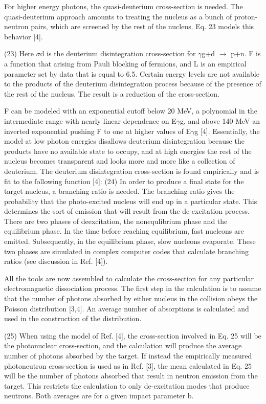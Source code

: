     For higher energy photons, the quasi-deuterium cross-section is needed.
    The quasi-deuterium approach amounts to treating the nucleus as a bunch of proton-neutron pairs, which are screened by the rest of the nucleus.
    Eq.
    23 models this behavior [4].
    
    (23)
    Here $\sigma$d is the deuterium disintegration cross-section for $\gamma$g+d $\rightarrow$ p+n.
    F is a function that arising from Pauli blocking of fermions, and L is an empirical parameter set by data that is equal to 6.5.
    Certain energy levels are not available to the products of the deuterium disintegration process because of the presence of the rest of the nucleus.
    The result is a reduction of the cross-section.
    
    F can be modeled with an exponential cutoff below 20 MeV, a polynomial in the intermediate range with nearly linear dependence on E$\gamma$g, and above 140 MeV an inverted exponential pushing F to one at higher values of E$\gamma$g [4].
    Essentially, the model at low photon energies disallows deuterium disintegration because the products have no available state to occupy, and at high energies the rest of the nucleus becomes transparent and looks more and more like a collection of deuterium.
    The deuterium disintegration cross-section is found empirically and is fit to the following function [4]:
    (24)
    In order to produce a final state for the target nucleus, a branching ratio is needed.
    The branching ratio gives the probability that the photo-excited nucleus will end up in a particular state.
    This determines the sort of emission that will result from the de-excitation process.
    There are two phases of deexcitation, the nonequlibrium phase and the equilibrium phase.
    In the time before reaching equilibrium, fast nucleons are emitted.
    Subsequently, in the equilibrium phase, slow nucleons evaporate.
    These two phases are simulated in complex computer codes that calculate branching ratios (see discussion in Ref.
    [4]).

    All the tools are now assembled to calculate the cross-section for any particular electromagnetic dissociation process.
    The first step in the calculation is to assume that the number of photons absorbed by either nucleus in the collision obeys the Poisson distribution [3,4].
    An average number of absorptions is calculated and used in the construction of the distribution.

    (25)
    When using the model of Ref.
    [4], the cross-section involved in Eq.
    25 will be the photonuclear cross-section, and the calculation will produce the average number of photons absorbed by the target.
    If instead the empirically measured photoneutron cross-section is used as in Ref.
    [3], the mean calculated in Eq.
    25 will be the number of photons absorbed that result in neutron emission from the target.
    This restricts the calculation to only de-excitation modes that produce neutrons.
    Both averages are for a given impact parameter b.


